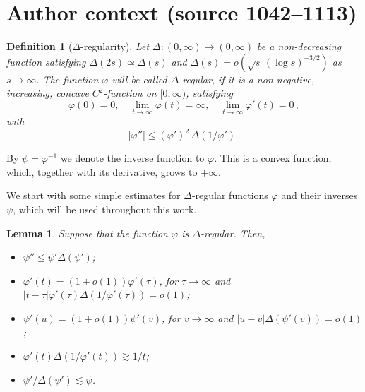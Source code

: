 \documentclass[10pt,a4paper]{amsart}
\newtheorem{lemma}{Lemma}
\newtheorem{definition}{Definition}
\begin{document}
\section*{Author context (source 1042--1113)}
\begin{definition}[$\Delta$-regularity]
Let $\Delta\colon (0, \infty)\to (0, \infty)$ be a non-decreasing function satisfying
$\Delta (2s) \simeq \Delta (s)$ and $ \Delta(s) = o( \sqrt{s}\,(\log s)^{-3/2})$ as $s\to\infty$.
The function $\varphi$ will be called $\Delta$-regular,
if it is a non-negative, increasing, concave $C^2$-function on $[0, \infty)$, satisfying
$$
\varphi (0) = 0,
\quad \lim_{t\to\infty} \varphi (t) = \infty, \quad \lim_{t\to\infty} \varphi' (t)= 0\,,
$$
with
\begin{equation}\label{eq:phi-very-new}
|\varphi''| \le (\varphi')^2\, \Delta(1/\varphi')\,.
\end{equation}
\end{definition}

By $\psi=\varphi^{-1}$ we denote the inverse function to $\varphi$.
This is a convex function, which, together with its derivative, grows to $+\infty$.

We start with some simple estimates for $\Delta$-regular functions $\varphi$ and their inverses
$\psi$, which will be used throughout this work.

\begin{lemma}\label{Lemma-AuxEstimates-new}
Suppose that the function $\varphi$ is $\Delta$-regular.
Then,
\begin{itemize}
\item[{\rm (a)}] $\psi''\le \psi'\Delta(\psi')$;
\item[{\rm (b)}] $\varphi'(t)=(1+o(1))\varphi'(\tau)$, for
$\tau\to\infty$ and
$|t-\tau|\varphi'(\tau)\Delta(1/\varphi'(\tau))=o(1)$;
\item[{\rm (c)}] $\psi'(u) = (1+o(1))\psi'(v)$, for
$v\to\infty$ and $|u-v|\Delta(\psi'(v))=o(1)$;
\item[{\rm (d)}] $\varphi'(t)\Delta(1/\varphi'(t)) \gtrsim 1/t$;
\item[{\rm (e)}] $\psi'/\Delta(\psi') \lesssim \psi$.
\end{itemize}
\end{lemma}
\end{document}
